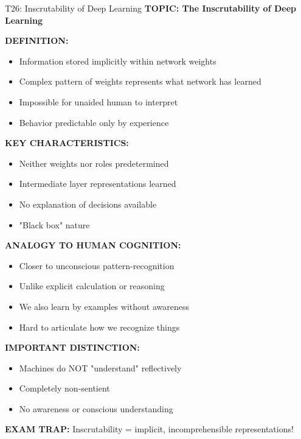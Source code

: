 \documentclass[8pt]{beamer}
\begin{document}
	\begin{frame}{T26: Inscrutability of Deep Learning}
		\fontsize{6.5}{7.5}\selectfont
		\textbf{TOPIC: The Inscrutability of Deep Learning}
		
		\vspace{0.1cm}
		\textbf{DEFINITION:}
		\begin{itemize}
			\item Information stored implicitly within network weights
			\item Complex pattern of weights represents what network has learned
			\item Impossible for unaided human to interpret
			\item Behavior predictable only by experience
		\end{itemize}
		
		\vspace{0.1cm}
		\textbf{KEY CHARACTERISTICS:}
		\begin{itemize}
			\item Neither weights nor roles predetermined
			\item Intermediate layer representations learned
			\item No explanation of decisions available
			\item "Black box" nature
		\end{itemize}
		
		\vspace{0.1cm}
		\textbf{ANALOGY TO HUMAN COGNITION:}
		\begin{itemize}
			\item Closer to unconscious pattern-recognition
			\item Unlike explicit calculation or reasoning
			\item We also learn by examples without awareness
			\item Hard to articulate how we recognize things
		\end{itemize}
		
		\vspace{0.1cm}
		\textbf{IMPORTANT DISTINCTION:}
		\begin{itemize}
			\item Machines do NOT "understand" reflectively
			\item Completely non-sentient
			\item No awareness or conscious understanding
		\end{itemize}
		
		\textcolor{myred}{\textbf{EXAM TRAP:}} Inscrutability = \textcolor{myblue}{implicit, incomprehensible representations}!
	\end{frame}
	
\end{document}
